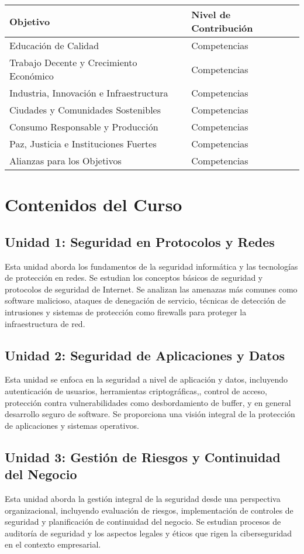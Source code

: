 \documentclass[12pt,a4paper]{article}
\begin{document}
\begin{table}[h]
\centering
\begin{tabular}{ll}
\toprule
\textbf{Objetivo} & \textbf{Nivel de Contribución} \\
\midrule
Educación de Calidad & Competencias \\
Trabajo Decente y Crecimiento Económico & Competencias \\
Industria, Innovación e Infraestructura & Competencias \\
Ciudades y Comunidades Sostenibles & Competencias \\
Consumo Responsable y Producción & Competencias \\
Paz, Justicia e Instituciones Fuertes & Competencias \\
Alianzas para los Objetivos & Competencias \\
\bottomrule
\end{tabular}
\end{table}

\section*{Contenidos del Curso}

\subsection*{Unidad 1: Seguridad en Protocolos y Redes}
Esta unidad aborda los fundamentos de la seguridad informática y las tecnologías de protección en redes. Se estudian los conceptos básicos de seguridad y protocolos de seguridad de Internet. Se analizan las amenazas más comunes como software malicioso, ataques de denegación de servicio, técnicas de detección de intrusiones y sistemas de protección como firewalls para proteger la infraestructura de red.

\subsection*{Unidad 2: Seguridad de Aplicaciones y Datos}
Esta unidad se enfoca en la seguridad a nivel de aplicación y datos, incluyendo autenticación de usuarios,  herramientas criptográficas,, control de acceso, protección contra vulnerabilidades como desbordamiento de buffer, y en general desarrollo seguro de software. Se proporciona una visión integral de la protección de aplicaciones y sistemas operativos.

\subsection*{Unidad 3: Gestión de Riesgos y Continuidad del Negocio}
Esta unidad aborda la gestión integral de la seguridad desde una perspectiva organizacional, incluyendo evaluación de riesgos, implementación de controles de seguridad y planificación de continuidad del negocio. Se estudian procesos de auditoría de seguridad y los aspectos legales y éticos que rigen la ciberseguridad en el contexto empresarial.
\end{document}
